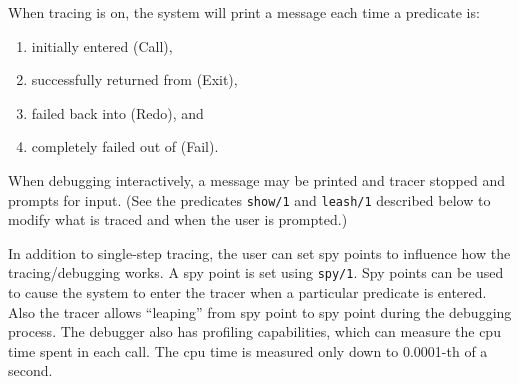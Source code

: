 \begin{description}

When tracing is on, the system will print a message each time a
predicate is:
\begin{enumerate} 
\item initially entered (Call), 
\item successfully returned from (Exit), 
\item failed back into (Redo), and
\item completely failed out of (Fail).  
\end{enumerate}
When debugging interactively, a message may be printed and tracer
stopped and prompts for input.  (See the predicates {\tt show/1} and
{\tt leash/1} described below to modify what is traced and when the
user is prompted.)

In addition to single-step tracing, the user can set spy points to
influence how the tracing/debugging works.  A spy point is set using
{\tt spy/1}.  Spy points can be used to cause the system to enter the
tracer when a particular predicate is entered. Also the tracer allows
``leaping'' from spy point to spy point during the debugging process.
%
The debugger also has profiling capabilities, which can measure the cpu
time spent in each call. The cpu time is measured only down to 0.0001-th
of a second.


\end{description}
